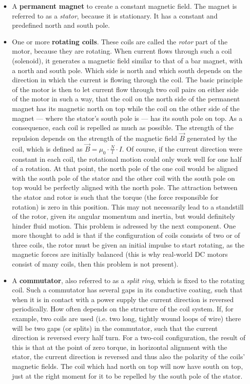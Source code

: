 \begin{itemize}
	
	\item A \textbf{permanent magnet} to create a constant magnetic field. The magnet is referred to as a \emph{stator}, because it is stationary. It has a constant and predefined north and south pole.

	\item One or more \textbf{rotating coils}. These coils are called the \emph{rotor} part of the motor, because they are rotating. When current flows through such a coil (solenoid), it generates a magnetic field similar to that of a bar magnet, with a north and south pole. Which side is north and which south depends on the direction in which the current is flowing through the coil. The basic principle of the motor is then to let current flow through two coil pairs on either side of the motor in such a way, that the coil on the north side of the permanent magnet has its magnetic north on top while the coil on the other side of the magnet --- where the stator's south pole is --- has its south pole on top. As a consequence, each coil is repelled as much as possible. The strength of the repulsion depends on the strength of the magnetic field $\vec{B}$ generated by the coil, which is defined as $\vec{B} = \mu_0 \cdot \frac{N}{l} \cdot I$. Of course, if the current direction were constant in each coil, the rotational motion could only work well for one half of a rotation. At that point, the north pole of the one coil would be aligned with the south pole of the stator and the other coil with the south pole on top would be perfectly aligned with the north pole. The attraction between the stator and rotor is such that the torque (the force responsible for rotation) is zero in this position. This may not necessarily lead to a standstill of the rotor, given its angular momentum and inertia, but would definitely hinder fluid motion. This problem is adressed by the next component. One more thought to add is that if the configuration of coils consists of two or of three coils, the rotor must be given an initial impulse to start rotating, as the magnetic forces are initially balanced (this is why real-world DC motors consist of many coils, then this problem is not present).

	\item A \textbf{commutator}, also referred to as a \emph{split ring}, which is fixed to the rotating coil. Such a commutator has several gaps in its conductive coating, such that when it is in contact with a power supply the current direction is reversed periodically. How often depends on the structure of the coil system. If, for example, two coils are used (i.e. two long, tightly wound loops of wire) there will be two gaps (or splits) in the commutator, such that the current direction is reversed every half turn. For a two-coil configuration, the result of this is that at the point of zero torque, in horizontal alignment with the stator, the current direction is reversed and thus also the polarity of the coils' magnetic fields. The coil which had north on top will now have south on top, just at the right moment for it to be repelled by the south pole of the stator.


\end{itemize}
